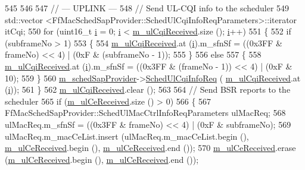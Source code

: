 \begin{DoxyCode}
545 
546 
547   \textcolor{comment}{// --- UPLINK ---}
548   \textcolor{comment}{// Send UL-CQI info to the scheduler}
549   std::vector <FfMacSchedSapProvider::SchedUlCqiInfoReqParameters>::iterator itCqi;
550   \textcolor{keywordflow}{for} (uint16\_t \hyperlink{bernuolliDistribution_8m_a6f6ccfcf58b31cb6412107d9d5281426}{i} = 0; \hyperlink{bernuolliDistribution_8m_a6f6ccfcf58b31cb6412107d9d5281426}{i} < \hyperlink{classns3_1_1LteEnbMac_a663195c0f6c73d6c6aa8e578a6df032a}{m\_ulCqiReceived}.size (); \hyperlink{bernuolliDistribution_8m_a6f6ccfcf58b31cb6412107d9d5281426}{i}++)
551     \{
552       \textcolor{keywordflow}{if} (subframeNo > 1)
553         \{        
554           \hyperlink{classns3_1_1LteEnbMac_a663195c0f6c73d6c6aa8e578a6df032a}{m\_ulCqiReceived}.at (\hyperlink{bernuolliDistribution_8m_a6f6ccfcf58b31cb6412107d9d5281426}{i}).m\_sfnSf = ((0x3FF & frameNo) << 4) | (0xF & (subframeNo - 
      1));
555         \}
556       \textcolor{keywordflow}{else}
557         \{
558           \hyperlink{classns3_1_1LteEnbMac_a663195c0f6c73d6c6aa8e578a6df032a}{m\_ulCqiReceived}.at (\hyperlink{bernuolliDistribution_8m_a6f6ccfcf58b31cb6412107d9d5281426}{i}).m\_sfnSf = ((0x3FF & (frameNo - 1)) << 4) | (0xF & 10);
559         \}
560       \hyperlink{classns3_1_1LteEnbMac_a48a4fe366fd18025fb8ebe4a3de2a143}{m\_schedSapProvider}->\hyperlink{classns3_1_1FfMacSchedSapProvider_aad26098eb7e7317f2d8287f11ab348d8}{SchedUlCqiInfoReq} (
      \hyperlink{classns3_1_1LteEnbMac_a663195c0f6c73d6c6aa8e578a6df032a}{m\_ulCqiReceived}.at (\hyperlink{bernuolliDistribution_8m_a6f6ccfcf58b31cb6412107d9d5281426}{i}));
561     \}
562     \hyperlink{classns3_1_1LteEnbMac_a663195c0f6c73d6c6aa8e578a6df032a}{m\_ulCqiReceived}.clear ();
563   
564   \textcolor{comment}{// Send BSR reports to the scheduler}
565   \textcolor{keywordflow}{if} (\hyperlink{classns3_1_1LteEnbMac_a5e182e74ebecda87f3d149da2840d4bd}{m\_ulCeReceived}.size () > 0)
566     \{
567       FfMacSchedSapProvider::SchedUlMacCtrlInfoReqParameters ulMacReq;
568       ulMacReq.m\_sfnSf = ((0x3FF & frameNo) << 4) | (0xF & subframeNo);
569       ulMacReq.m\_macCeList.insert (ulMacReq.m\_macCeList.begin (), \hyperlink{classns3_1_1LteEnbMac_a5e182e74ebecda87f3d149da2840d4bd}{m\_ulCeReceived}.begin (), 
      \hyperlink{classns3_1_1LteEnbMac_a5e182e74ebecda87f3d149da2840d4bd}{m\_ulCeReceived}.end ());
570       \hyperlink{classns3_1_1LteEnbMac_a5e182e74ebecda87f3d149da2840d4bd}{m\_ulCeReceived}.erase (\hyperlink{classns3_1_1LteEnbMac_a5e182e74ebecda87f3d149da2840d4bd}{m\_ulCeReceived}.begin (), 
      \hyperlink{classns3_1_1LteEnbMac_a5e182e74ebecda87f3d149da2840d4bd}{m\_ulCeReceived}.end ());

\end{DoxyCode}

